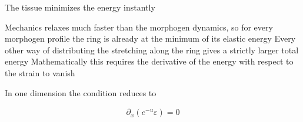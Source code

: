 

\begin{frame}{The tissue minimizes the energy instantly}

  \vspace{0.06cm}

  \begin{center}
    \begin{minipage}{0.86\linewidth}

        {Mechanics relaxes much faster than the morphogen dynamics, so for every morphogen profile the ring is already at the minimum of its elastic energy}
      \vspace{0.24cm}
        {Every other way of distributing the stretching along the ring gives a strictly larger total energy}
      \vspace{0.24cm}
        {Mathematically this requires the derivative of the energy with respect to the strain to vanish}

      \vspace{0.30cm}

      {\color{HydraMuted}\fontsize{7.6}{9.3}\selectfont
        In one dimension the condition reduces to
      \par}
      \vspace{-0.10cm}
      {\color{HydraGold}\bfseries\fontsize{13.5}{17}\selectfont
      \begin{align*}
        \boxed{\partial_x\!\left(e^{-u}\varepsilon\right)=0}
      \end{align*}
      }
      \par
      \vspace{-0.20cm}

    \end{minipage}
  \end{center}

\end{frame}





